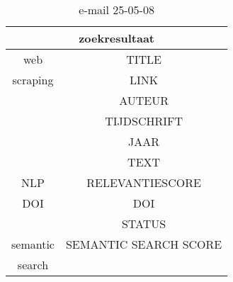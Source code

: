 \begin{table}[h!]
    \caption{e-mail 25-05-08}
    \centering
    \begin{tabular}{|c|c|} 
        \hline
        \multicolumn{2}{|c|}{\textbf{zoekresultaat}} \\
        \hline
        web &TITLE\\
        scraping&LINK\\
        &AUTEUR\\
        &TIJDSCHRIFT\\
        &JAAR\\
        &TEXT\\
        \hline
        NLP&RELEVANTIESCORE\\
        \hline
        DOI&DOI\\
        &STATUS\\
        \hline
        semantic&SEMANTIC SEARCH SCORE\\
        search&\\
        \hline
    \end{tabular}
    \label{table:email20250508}
\end{table}

